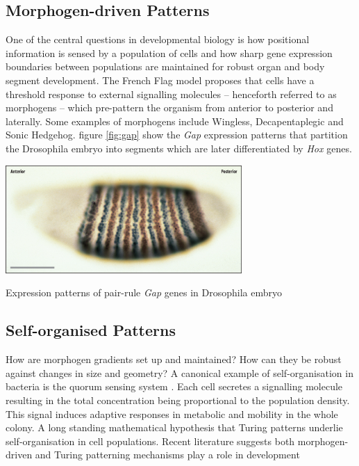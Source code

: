 \subsection{Morphogen-driven Patterns}
One of the central questions in developmental biology is how positional information is
sensed by a population of cells and how sharp gene expression boundaries between
populations are maintained for robust organ and body segment development. The
French Flag model \cite{Wolpert1969PositionalDifferentiation.} proposes that cells
have a threshold response to external signalling molecules -- henceforth referred
to as morphogens -- which pre-pattern the organism from anterior to posterior and
laterally. Some examples of morphogens include Wingless, Decapentaplegic and Sonic Hedgehog.
figure \ref{fig:gap} show the \textit{Gap} expression patterns that partition the
Drosophila embryo into segments which are later differentiated by \textit{Hox} genes.

\begin{Figure}
\includegraphics[width=90mm]{figures/gap.jpg}
\caption{Expression patterns of pair-rule \textit{Gap} genes in Drosophila embryo \cite{}}
\label{fig:gap}
\end{Figure}

\subsection{Self-organised Patterns}
How are morphogen gradients set up and maintained? How can they be robust against
changes in size and geometry? A canonical example of self-organisation in bacteria
is the quorum sensing system \cite{Miller2001QuorumBacteria}. Each cell secretes a
signalling molecule resulting in the total concentration being proportional to
the population density. This signal induces adaptive responses in metabolic and
mobility in the whole colony. A long standing mathematical hypothesis that
Turing patterns underlie self-organisation in cell populations. Recent literature
suggests both morphogen-driven and Turing patterning mechanisms play a role in development 
\cite{Green2015PositionalCombine}

